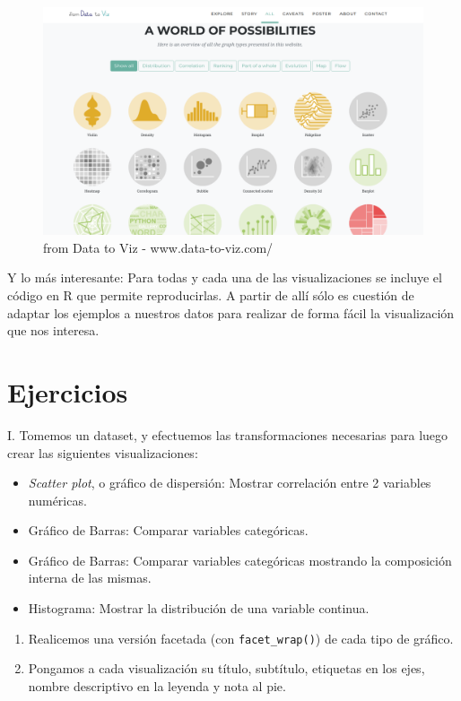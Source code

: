 \documentclass[
]{book}
\providecommand{\tightlist}{%
  \setlength{\itemsep}{0pt}\setlength{\parskip}{0pt}}
\begin{document}
\begin{figure}
\includegraphics[width=1\linewidth]{imagenes/data_to_viz} \caption{from Data to Viz - www.data-to-viz.com/}\label{fig:unnamed-chunk-117}
\end{figure}

Y lo más interesante: Para todas y cada una de las visualizaciones se incluye el código en R que permite reproducirlas. A partir de allí sólo es cuestión de adaptar los ejemplos a nuestros datos para realizar de forma fácil la visualización que nos interesa.

\hypertarget{ejercicios-2}{%
\section{Ejercicios}\label{ejercicios-2}}

I. Tomemos un dataset, y efectuemos las transformaciones necesarias para luego crear las siguientes visualizaciones:

\begin{itemize}
\tightlist
\item
  \emph{Scatter plot}, o gráfico de dispersión: Mostrar correlación entre 2 variables numéricas.
\item
  Gráfico de Barras: Comparar variables categóricas.
\item
  Gráfico de Barras: Comparar variables categóricas mostrando la composición interna de las mismas.\\
\item
  Histograma: Mostrar la distribución de una variable continua.
\end{itemize}

\begin{enumerate}
\def\labelenumi{\Roman{enumi}.}
\setcounter{enumi}{1}
\item
  Realicemos una versión facetada (con \texttt{facet\_wrap()}) de cada tipo de gráfico.
\item
  Pongamos a cada visualización su título, subtítulo, etiquetas en los ejes, nombre descriptivo en la leyenda y nota al pie.
\end{enumerate}
\end{document}
